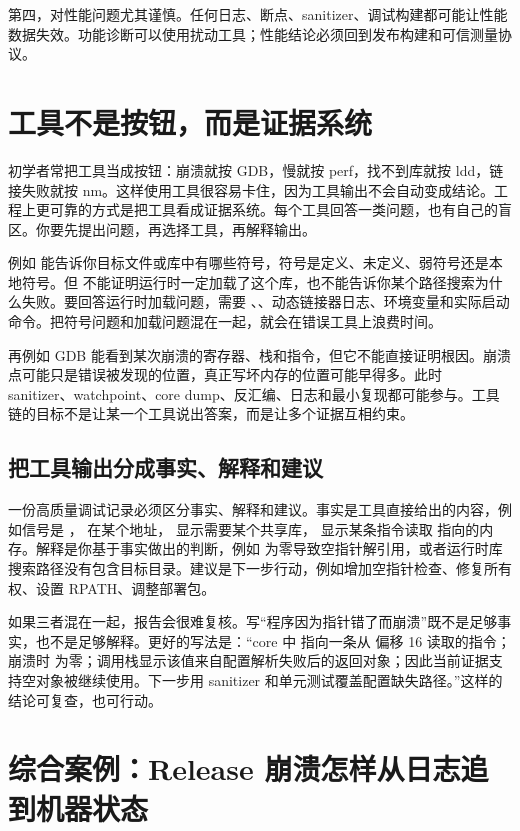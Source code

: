 第四，对性能问题尤其谨慎。任何日志、断点、sanitizer、调试构建都可能让性能数据失效。功能诊断可以使用扰动工具；性能结论必须回到发布构建和可信测量协议。

\section{工具不是按钮，而是证据系统}

初学者常把工具当成按钮：崩溃就按 GDB，慢就按 perf，找不到库就按 ldd，链接失败就按 nm。这样使用工具很容易卡住，因为工具输出不会自动变成结论。工程上更可靠的方式是把工具看成证据系统。每个工具回答一类问题，也有自己的盲区。你要先提出问题，再选择工具，再解释输出。

例如  能告诉你目标文件或库中有哪些符号，符号是定义、未定义、弱符号还是本地符号。但  不能证明运行时一定加载了这个库，也不能告诉你某个路径搜索为什么失败。要回答运行时加载问题，需要 、、动态链接器日志、环境变量和实际启动命令。把符号问题和加载问题混在一起，就会在错误工具上浪费时间。

再例如 GDB 能看到某次崩溃的寄存器、栈和指令，但它不能直接证明根因。崩溃点可能只是错误被发现的位置，真正写坏内存的位置可能早得多。此时 sanitizer、watchpoint、core dump、反汇编、日志和最小复现都可能参与。工具链的目标不是让某一个工具说出答案，而是让多个证据互相约束。

\subsection{把工具输出分成事实、解释和建议}

一份高质量调试记录必须区分事实、解释和建议。事实是工具直接给出的内容，例如信号是 ， 在某个地址， 显示需要某个共享库， 显示某条指令读取  指向的内存。解释是你基于事实做出的判断，例如  为零导致空指针解引用，或者运行时库搜索路径没有包含目标目录。建议是下一步行动，例如增加空指针检查、修复所有权、设置 RPATH、调整部署包。

如果三者混在一起，报告会很难复核。写“程序因为指针错了而崩溃”既不是足够事实，也不是足够解释。更好的写法是：“core 中  指向一条从  偏移 16 读取的指令；崩溃时  为零；调用栈显示该值来自配置解析失败后的返回对象；因此当前证据支持空对象被继续使用。下一步用 sanitizer 和单元测试覆盖配置缺失路径。”这样的结论可复查，也可行动。

\section{综合案例：Release 崩溃怎样从日志追到机器状态}


